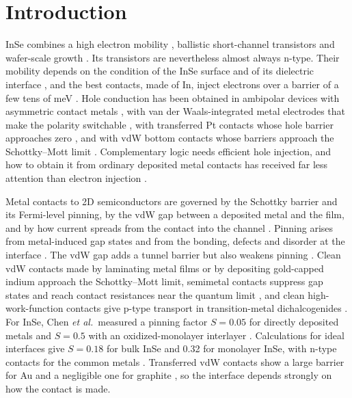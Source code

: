 \documentclass[11pt]{article}
\begin{document}
\section{Introduction}
InSe combines a high electron mobility \cite{refband,refsuch,reffeng14}, ballistic short-channel transistors \cite{refjiang} and wafer-scale growth \cite{refqin}. Its transistors are nevertheless almost always n-type. Their mobility depends on the condition of the InSe surface and of its dielectric interface \cite{refho,reffeng14}, and the best contacts, made of In, inject electrons over a barrier of a few tens of meV \cite{refhuang}. Hole conduction has been obtained in ambipolar devices with asymmetric contact metals \cite{reflin}, with van der Waals-integrated metal electrodes that make the polarity switchable \cite{refhu}, with transferred Pt contacts whose hole barrier approaches zero \cite{refwei}, and with vdW bottom contacts whose barriers approach the Schottky--Mott limit \cite{refkim24}. Complementary logic needs efficient hole injection, and how to obtain it from ordinary deposited metal contacts has received far less attention than electron injection \cite{refsong}.

Metal contacts to 2D semiconductors are governed by the Schottky barrier and its Fermi-level pinning, by the vdW gap between a deposited metal and the film, and by how current spreads from the contact into the channel \cite{refallain,refschulman,refwangchh}. Pinning arises from metal-induced gap states and from the bonding, defects and disorder at the interface \cite{reftung,refkim17}. The vdW gap adds a tunnel barrier \cite{refkang} but also weakens pinning \cite{refliusa}. Clean vdW contacts made by laminating metal films \cite{refliu18} or by depositing gold-capped indium \cite{refwangy19} approach the Schottky--Mott limit, semimetal contacts suppress gap states and reach contact resistances near the quantum limit \cite{refshen,refli23}, and clean high-work-function contacts give p-type transport in transition-metal dichalcogenides \cite{refwangy22}. For InSe, Chen \textit{et al.}\ measured a pinning factor $S=0.05$ for directly deposited metals and $S=0.5$ with an oxidized-monolayer interlayer \cite{refchen}. Calculations for ideal interfaces give $S=0.18$ for bulk InSe \cite{refguo} and 0.32 for monolayer InSe, with n-type contacts for the common metals \cite{refshi}. Transferred vdW contacts show a large barrier for Au and a negligible one for graphite \cite{refzhao}, so the interface depends strongly on how the contact is made.
\end{document}

